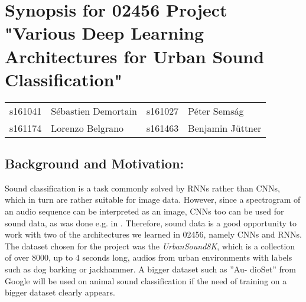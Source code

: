 \documentclass[utf-8]{article}
\newcommand{\urb}{\textit{UrbanSound8K}}
\begin{document}
\section*{Synopsis for 02456 Project "Various Deep Learning Architectures for Urban Sound Classification"}
\begin{tabular}{ll|ll}
s161041 &Sébastien Demortain &s161027 &Péter Semság\\
 s161174 &Lorenzo Belgrano &s161463 &Benjamin Jüttner
\end{tabular}

\subsection*{Background and Motivation:}
Sound classification is a task commonly solved by RNNs rather than CNNs, which in turn are rather suitable for image data. However, since a spectrogram of an audio sequence can be interpreted as an image, CNNs too can be used for sound data, as was done e.g. in \cite{pizza}. Therefore, sound data is a good opportunity to work with two of the architectures we learned in 02456, namely CNNs and RNNs. The dataset chosen for the project was the \urb\cite{urban}, which is a collection of over 8000, up to 4 seconds long, audios from urban environments with labels such as dog barking or jackhammer. A bigger dataset such as ”Au-
dioSet” from Google \cite{seba} will be used on animal sound classification if the need of
training on a bigger dataset clearly appears.  
\end{document}
